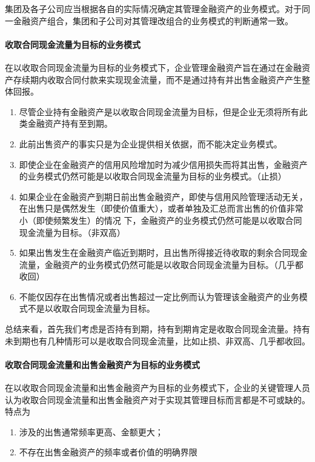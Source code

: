 \documentclass[UTF8,12pt]{ctexart}
\numberwithin{equation}{section} %
\numberwithin{figure}{section}
\numberwithin{table}{section}
\begin{document}
	集团及各子公司应当根据各自的实际情况确定其管理金融资产的业务模式。对于同一金融资产组合，集团和子公司对其管理改组合的业务模式的判断通常一致。
	
	\paragraph{收取合同现金流量为目标的业务模式}
	在以收取合同现金流量为目标的业务模式下，企业管理金融资产旨在通过在金融资产存续期内收取合同付款来实现现金流量，而不是通过持有并出售金融资产产生整体回报。
	
	\begin{enumerate}
		\item 尽管企业持有金融资产是以收取合同现金流量为目标，但是企业无须将所有此类金融资产持有至到期。
		
		\item 此前出售资产的事实只是为企业提供相关依据，而不能决定业务模式。
		
		\item 即使企业在金融资产的信用风险增加时为减少信用损失而将其出售，金融资产的业务模式仍然可能是以收取合同现金流量为目标的业务模式。（止损）
		
		\item 如果企业在金融资产到期日前出售金融资产，即使与信用风险管理活动无关，在出售只是偶然发生（即使价值重大），或者单独及汇总而言出售的价值非常小（即使频繁发生）的情况  下，金融资产的业务模式仍然可能是以收取合同现金流量为目标。（非双高）
		
		\item 如果出售发生在金融资产临近到期时，且出售所得接近待收取的剩余合同现金流量，金融资产的业务模式仍然可能是以收取合同现金流量为目标。（几乎都收回）
		
		\item 不能仅因存在出售情况或者出售超过一定比例而认为管理该金融资产的业务模式不是以收取合同现金流量为目标。
	\end{enumerate}
	
	总结来看，首先我们考虑是否持有到期，持有到期肯定是收取合同现金流量。持有未到期也有几种情形可以是收取合同现金流量，比如止损、非双高、几乎都收回。
	
	\paragraph{收取合同现金流量和出售金融资产为目标的业务模式}
	在以收取合同现金流量和出售金融资产为目标的业务模式下，企业的关键管理人员认为收取合同现金流量和出售金融资产对于实现其管理目标而言都是不可或缺的。特点为
	\begin{enumerate}
		\item 涉及的出售通常频率更高、金额更大；
		
		\item 不存在出售金融资产的频率或者价值的明确界限
	\end{enumerate}
	
\end{document}
